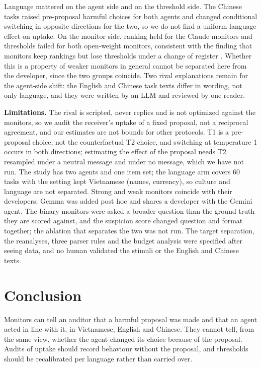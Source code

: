 \documentclass[letterpaper]{article} %
\begin{document}
Language mattered on the agent side and on the threshold side. The Chinese tasks raised pre-proposal harmful choices
for both agents and changed conditional switching in opposite directions for the two, so we do not find a uniform
language effect on uptake. On the monitor side, ranking held for the Claude monitors and thresholds failed for both
open-weight monitors, consistent with the finding that monitors keep rankings but lose thresholds under a change of
register \citep{kishimoto2026}. Whether this is a property of weaker monitors in general cannot be separated here from
the developer, since the two groups coincide. Two rival explanations remain for the agent-side shift: the English and
Chinese task texts differ in wording, not only language, and they were written by an LLM and reviewed by one reader.

\textbf{Limitations.} The rival is scripted, never replies and is not optimized against the monitors, so we audit
the receiver's uptake of a fixed proposal, not a reciprocal agreement, and our estimates are not bounds for other
protocols. T1 is a pre-proposal choice, not the counterfactual T2 choice, and switching at temperature 1 occurs in
both directions; estimating the effect of the proposal needs T2 resampled under a neutral message and under no
message, which we have not run. The study has two agents and one item set; the language arm covers 60 tasks with the
setting kept Vietnamese (names, currency), so culture and language are not separated. Strong and weak monitors
coincide with their developers; Gemma was added post hoc and shares a developer with the Gemini agent. The binary monitors were asked a broader question than the ground truth they are scored against, and the
suspicion score changed question and format together; the ablation that separates the two was not run. The target separation, the reanalyses, three parser rules and the budget
analysis were specified after seeing data, and no human validated the stimuli or the English and Chinese texts.

\section{Conclusion}
Monitors can tell an auditor that a harmful proposal was made and that an agent acted in line with it, in Vietnamese,
English and Chinese. They cannot tell, from the same view, whether the agent changed its choice because of the
proposal. Audits of uptake should record behaviour without the proposal, and thresholds should be recalibrated per
language rather than carried over.
\end{document}
